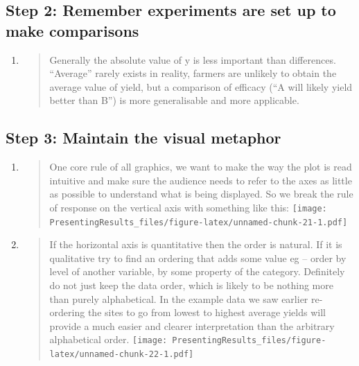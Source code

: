 \documentclass[
  titlepage]{book}
\begin{document}
\hypertarget{step-2-remember-experiments-are-set-up-to-make-comparisons}{%
\subsection{Step 2: Remember experiments are set up to make comparisons}\label{step-2-remember-experiments-are-set-up-to-make-comparisons}}

\begin{enumerate}
\def\labelenumi{\alph{enumi}.}
\item
  \begin{quote}
  Generally the absolute value of y is less important than differences. ``Average'' rarely exists in reality, farmers are unlikely to obtain the average value of yield, but a comparison of efficacy (``A will likely yield better than B'') is more generalisable and more applicable.
  \end{quote}
\end{enumerate}

\hypertarget{step-3-maintain-the-visual-metaphor}{%
\subsection{Step 3: Maintain the visual metaphor}\label{step-3-maintain-the-visual-metaphor}}

\begin{enumerate}
\def\labelenumi{\alph{enumi}.}
\item
  \begin{quote}
  One core rule of all graphics, we want to make the way the plot is read intuitive and make sure the audience needs to refer to the axes as little as possible to understand what is being displayed. So we break the rule of response on the vertical axis with something like this:
  \texttt{[image: PresentingResults\_files/figure-latex/unnamed-chunk-21-1.pdf]}
  \end{quote}
\item
  \begin{quote}
  If the horizontal axis is quantitative then the order is natural. If it is qualitative try to find an ordering that adds some value eg -- order by level of another variable, by some property of the category. Definitely do not just keep the data order, which is likely to be nothing more than purely alphabetical. In the example data we saw earlier re-ordering the sites to go from lowest to highest average yields will provide a much easier and clearer interpretation than the arbitrary alphabetical order.
  \texttt{[image: PresentingResults\_files/figure-latex/unnamed-chunk-22-1.pdf]}
  \end{quote}
\end{enumerate}
\end{document}
